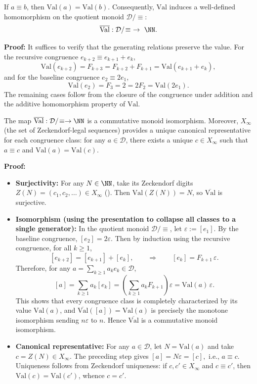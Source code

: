 \begin{proposition}\label{prop:val-invariant}
If $a\equiv b$, then $\mathrm{Val}(a)=\mathrm{Val}(b)$. Consequently, $\mathrm{Val}$ induces a well-defined homomorphism on the quotient monoid $\mathcal{D}/\!\equiv$:
\[
\overline{\mathrm{Val}}:\mathcal{D}/\!\equiv\ \to\ \NN.
\]
\end{proposition}

\textbf{Proof:}
It suffices to verify that the generating relations preserve the value. For the recursive congruence $e_{k+2}\equiv e_{k+1}+e_k$,
\[
\mathrm{Val}(e_{k+2})=F_{k+3}=F_{k+2}+F_{k+1}=\mathrm{Val}(e_{k+1}+e_k),
\]
and for the baseline congruence $e_2\equiv 2e_1$,
\[
\mathrm{Val}(e_2)=F_3=2=2F_2=\mathrm{Val}(2e_1).
\]
The remaining cases follow from the closure of the congruence under addition and the additive homomorphism property of $\mathrm{Val}$.

\begin{theorem}\label{thm:monoid-quotient-is-N}
The map $\overline{\mathrm{Val}}:\mathcal{D}/\!\equiv \to \NN$ is a commutative monoid isomorphism. Moreover, $X_\infty$ (the set of Zeckendorf-legal sequences) provides a unique canonical representative for each congruence class: for any $a\in\mathcal{D}$, there exists a unique $c\in X_\infty$ such that $a\equiv c$ and $\mathrm{Val}(a)=\mathrm{Val}(c)$.
\end{theorem}

\textbf{Proof:}
\begin{itemize}
  \item \textbf{Surjectivity:} For any $N\in\NN$, take its Zeckendorf digits $Z(N)=(c_1,c_2,\dots)\in X_\infty$ (\cite{Zeckendorf1972}). Then $\mathrm{Val}(Z(N))=N$, so $\overline{\mathrm{Val}}$ is surjective.
  \item \textbf{Isomorphism (using the presentation to collapse all classes to a single generator):}
  In the quotient monoid $\mathcal{D}/\!\equiv$, let $\varepsilon:=[e_1]$. By the baseline congruence, $[e_2]=2\varepsilon$. Then by induction using the recursive congruence, for all $k\ge 1$,
  \[
  [e_{k+2}]=[e_{k+1}]+[e_k],
  \qquad
  \Rightarrow\qquad
  [e_k]=F_{k+1}\,\varepsilon.
  \]
  Therefore, for any $a=\sum_{k\ge 1} a_k e_k\in\mathcal{D}$,
  \[
  [a]=\sum_{k\ge 1} a_k [e_k]=\left(\sum_{k\ge 1} a_k F_{k+1}\right)\varepsilon
  =\mathrm{Val}(a)\,\varepsilon.
  \]
This shows that every congruence class is completely characterized by its value $\mathrm{Val}(a)$, and $\overline{\mathrm{Val}}([a])=\mathrm{Val}(a)$ is precisely the monotone isomorphism sending $n\varepsilon$ to $n$. Hence $\overline{\mathrm{Val}}$ is a commutative monoid isomorphism.
  \item \textbf{Canonical representative:} For any $a\in\mathcal{D}$, let $N=\mathrm{Val}(a)$ and take $c=Z(N)\in X_\infty$. The preceding step gives
  \(
  [a]=N\varepsilon=[c],
  \)
  i.e., $a\equiv c$. Uniqueness follows from Zeckendorf uniqueness: if $c,c'\in X_\infty$ and $c\equiv c'$, then $\mathrm{Val}(c)=\mathrm{Val}(c')$, whence $c=c'$.
\end{itemize}

